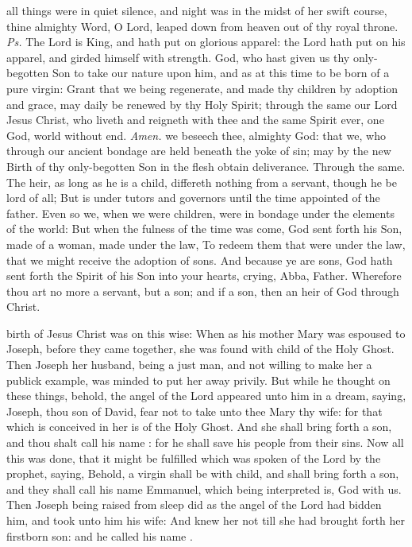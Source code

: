 \introit
{} all things were in quiet silence, and night was in the midst of her swift course, thine almighty Word, O Lord, leaped down from heaven out of thy royal throne. \textit{Ps.} The Lord is King, and hath put on glorious apparel: the Lord hath put on his apparel, and girded himself with strength.
\collect
{} God, who hast given us thy only-begotten Son to take our nature upon him, and as at this time to be born of a pure virgin: Grant that we being regenerate, and made thy children by adoption and grace, may daily be renewed by thy Holy Spirit; through the same our Lord Jesus Christ, who liveth and reigneth with thee and the same Spirit ever, one God, world without end. \textit{Amen.}
 we beseech thee, almighty God: that we, who through our ancient bondage are held beneath the yoke of sin; may by the new Birth of thy only-begotten Son in the flesh obtain deliverance. Through the same.
 The heir, as long as he is a child, differeth nothing from a servant, though he be lord of all; But is under tutors and governors until the time appointed of the father. Even so we, when we were children, were in bondage under the elements of the world: But when the fulness of the time was come, God sent forth his Son, made of a woman, made under the law, To redeem them that were under the law, that we might receive the adoption of sons. And because ye are sons, God hath sent forth the Spirit of his Son into your hearts, crying, Abba, Father. Wherefore thou art no more a servant, but a son; and if a son, then an heir of God through Christ.

 birth of Jesus Christ was on this wise: When as his mother Mary was espoused to Joseph, before they came together, she was found with child of the Holy Ghost. Then Joseph her husband, being a just man, and not willing to make her a publick example, was minded to put her away privily. But while he thought on these things, behold, the angel of the Lord appeared unto him in a dream, saying, Joseph, thou son of David, fear not to take unto thee Mary thy wife: for that which is conceived in her is of the Holy Ghost. And she shall bring forth a son, and thou shalt call his name : for he shall save his people from their sins. Now all this was done, that it might be fulfilled which was spoken of the Lord by the prophet, saying, Behold, a virgin shall be with child, and shall bring forth a son, and they shall call his name Emmanuel, which being interpreted is, God with us. Then Joseph being raised from sleep did as the angel of the Lord had bidden him, and took unto him his wife: And knew her not till she had brought forth her firstborn son: and he called his name .

